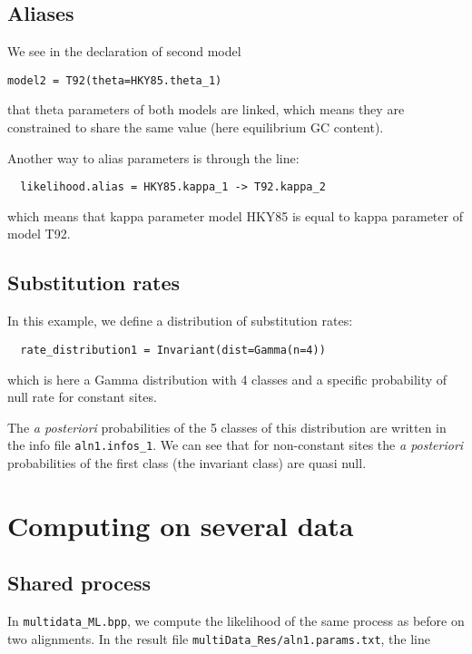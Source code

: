 \documentclass{article}
\begin{document}
\subsection*{Aliases}

We see in the declaration of second model

\begin{verbatim}
model2 = T92(theta=HKY85.theta_1)
\end{verbatim}

that theta parameters of both models are linked, which means they are
constrained to share the same value (here equilibrium GC content).

Another way to alias parameters is through the line:

\begin{verbatim}
  likelihood.alias = HKY85.kappa_1 -> T92.kappa_2
\end{verbatim}

which means that kappa parameter model HKY85 is equal to kappa
parameter of model T92.

\subsection*{Substitution rates}

In this example, we define a distribution of substitution rates:

\begin{verbatim}
  rate_distribution1 = Invariant(dist=Gamma(n=4))
\end{verbatim}

which is here a Gamma distribution with 4 classes and a specific
probability of null rate for constant sites.

The \textit{a posteriori} probabilities of the 5 classes of this
distribution are written in the info file \verb|aln1.infos_1|. We can
see that for non-constant sites the \textit{a posteriori}
probabilities of the first class (the invariant class) are quasi null.

\section{Computing on several data}

\subsection{Shared process}

In \verb#multidata_ML.bpp#, we compute the likelihood of the same
process as before on two alignments. 
In the result file \verb#multiData_Res/aln1.params.txt#, the line
\end{document}
